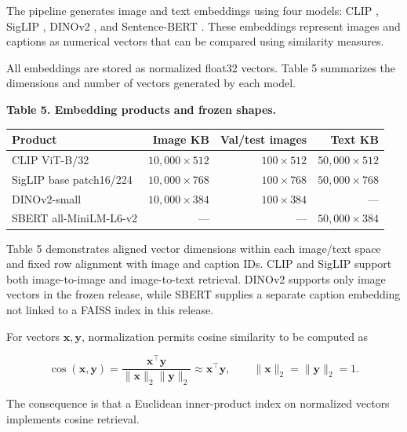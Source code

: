 \documentclass{article}
\begin{document}
The pipeline generates image and text embeddings using four models:
CLIP \cite{radford_learning_2021}, SigLIP \cite{zhai_sigmoid_2023},
DINOv2 \cite{oquab_dinov2_2023}, and Sentence-BERT
\cite{reimers_sentence-bert_2019}. These embeddings represent
images and captions as numerical vectors that can be compared using
similarity measures.

All embeddings are stored as normalized float32 vectors. Table 5
summarizes the dimensions and number of vectors generated by each
model.

\begin{center}
\textbf{Table 5. Embedding products and frozen shapes.}
\end{center}

\begin{table}[htbp]
\centering
\begin{tabular}{lrrr}
\toprule
Product & Image KB & Val/test images & Text KB \\
\midrule
CLIP ViT-B/32 & \(10{,}000\times512\) & \(100\times512\) & \(50{,}000\times512\) \\
SigLIP base patch16/224 & \(10{,}000\times768\) & \(100\times768\) & \(50{,}000\times768\) \\
DINOv2-small & \(10{,}000\times384\) & \(100\times384\) & --- \\
SBERT all-MiniLM-L6-v2 & --- & --- & \(50{,}000\times384\) \\
\bottomrule
\end{tabular}
\end{table}

Table 5 demonstrates aligned vector dimensions within each image/text
space and fixed row alignment with image and caption IDs. CLIP and
SigLIP support both image-to-image and image-to-text retrieval. DINOv2
supports only image vectors in the frozen release, while SBERT supplies
a separate caption embedding not linked to a FAISS index in this
release.

For vectors \(\mathbf x,\mathbf y\), normalization permits cosine
similarity to be computed as

\begin{equation*}
\cos(\mathbf{x},\mathbf{y})
=\frac{\mathbf{x}^{\top}\mathbf{y}}
       {\|\mathbf{x}\|_{2}\|\mathbf{y}\|_{2}}
\approx \mathbf{x}^{\top}\mathbf{y},
\qquad \|\mathbf{x}\|_{2}=\|\mathbf{y}\|_{2}=1.
\end{equation*}

The consequence is that a Euclidean inner-product index on normalized
vectors implements cosine retrieval.
\end{document}
